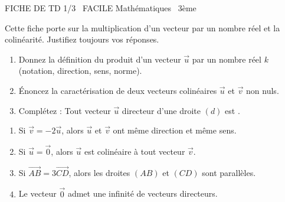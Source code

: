 \documentclass[11pt]{article}
\begin{document}
\begin{tcolorbox}[enhanced,colback=popink,colframe=popink,arc=10pt,boxrule=0pt,left=12pt,right=12pt,top=9pt,bottom=9pt]
{\color{white}\popxbold\small FICHE DE TD 1/3 \textbullet\ FACILE \hfill Mathématiques \textbullet\ 3ème\par}
\end{tcolorbox}
\vspace{4pt}
Cette fiche porte sur la multiplication d'un vecteur par un nombre réel et la colinéarité. Justifiez toujours vos réponses.

\begin{exercice}
\begin{enumerate}
    \item Donnez la définition du produit d'un vecteur $\vec{u}$ par un nombre réel $k$ (notation, direction, sens, norme).
    \item Énoncez la caractérisation de deux vecteurs colinéaires $\vec{u}$ et $\vec{v}$ non nuls.
    \item Complétez : Tout vecteur $\vec{u}$ directeur d'une droite $(d)$ est \underline{\hspace{4cm}}.
\end{enumerate}
\end{exercice}

\begin{exercice}
\begin{enumerate}
    \item Si $\vec{v} = -2\vec{u}$, alors $\vec{u}$ et $\vec{v}$ ont même direction et même sens.
    \item Si $\vec{u} = \vec{0}$, alors $\vec{u}$ est colinéaire à tout vecteur $\vec{v}$.
    \item Si $\vec{AB} = 3\vec{CD}$, alors les droites $(AB)$ et $(CD)$ sont parallèles.
    \item Le vecteur $\vec{0}$ admet une infinité de vecteurs directeurs.
\end{enumerate}
\end{exercice}
\end{document}
